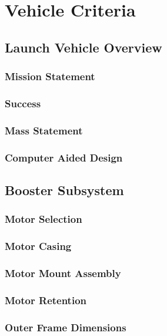 \chapter{Vehicle Criteria}

\section{Launch Vehicle Overview}
    
    \subsection{Mission Statement}
    
    \subsection{Success}
    
    \subsection{Mass Statement}
    
    \subsection{Computer Aided Design}
    

\section{Booster Subsystem}

    \subsection{Motor Selection}

    \subsection{Motor Casing}


    \subsection{Motor Mount Assembly}


    \subsection{Motor Retention}


    \subsection{Outer Frame Dimensions}


